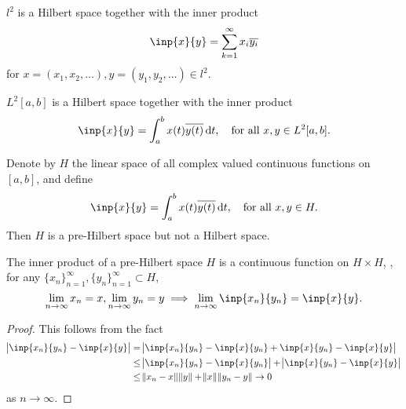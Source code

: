 \begin{example}
$l^2$ is a Hilbert space together with the inner product 
\begin{equation*}
    \inp{x}{y} = \sum_{k=1}^{\infty} x_i \conj{y_i} 
\end{equation*}
for $x = \left(x_1, x_2, \ldots \right), y = \left(y_1, y_2, \ldots \right) 
\in l^2$. 
\end{example}

\begin{example}
$L^2[a, b]$ is a Hilbert space together with the inner product 
\begin{equation*}
    \inp{x}{y} = \int_{a}^{b} x(t) \conj{y(t)} \diff t, \quad 
    \text{for all } x, y \in L^2[a, b]. 
\end{equation*}
\end{example}

\begin{example}
Denote by $H$ the linear space of all complex valued continuous functions 
on $[a, b]$, and define 
\begin{equation*}
    \inp{x}{y} = \int_{a}^{b} x(t) \conj{y(t)} \diff t, \quad 
    \text{for all } x, y \in H.  
\end{equation*}
Then $H$ is a pre-Hilbert space but not a Hilbert space. 
\end{example}

\begin{thm}
The inner product of a pre-Hilbert space $H$ is a continuous function on 
$H \times H$, \ie, for any $\{ x_n \}_{n=1}^{\infty}, 
\{ y_n \}_{n=1}^{\infty} \subset H$, 
\begin{equation*}
    \lim_{n \to \infty} x_n = x, \lim_{n \to \infty} y_n = y
    \implies
    \lim_{n \to \infty} \inp{x_n}{y_n} = \inp{x}{y}. 
\end{equation*}
\end{thm}
\begin{proof}
This follows from the fact 
\begin{equation*}
    \begin{aligned}
        \abs{\inp{x_n}{y_n} - \inp{x}{y}} 
        &= \abs{ \inp{x_n}{y_n} - \inp{x}{y_n} 
            + \inp{x}{y_n} - \inp{x}{y} } \\
        &\le \abs{ \inp{x_n}{y_n} - \inp{x}{y_n} } 
            + \abs{ \inp{x}{y_n} - \inp{x}{y} } \\
        &\le \norm{x_n - x}\norm{y} + \norm{x}\norm{y_n - y} \to 0
    \end{aligned}
\end{equation*}
as $n \to \infty$.
\end{proof}

